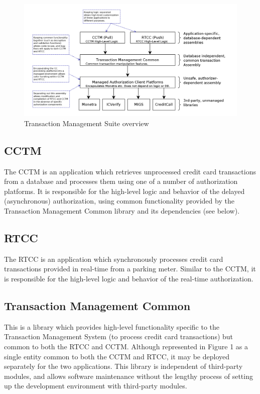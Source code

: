 \documentclass[a4paper,oneside,10pt]{report}
\begin{document}
\begin{figure}
	\centering
		\includegraphics[width=1.0\textwidth]{RTCC_CCTM_Layers.png}
	\caption{Transaction Management Suite overview}
	\label{fig:SuiteOverview}
\end{figure}

\subsection*{CCTM}
The CCTM is an application which retrieves unprocessed credit card transactions from a database and processes them using one of a number of authorization platforms. It is responsible for the high-level logic and behavior of the delayed (asynchronous) authorization, using common functionality provided by the Transaction Management Common library and its dependencies (see below).
\subsection*{RTCC}
The RTCC is an application which synchronously processes credit card transactions provided in real-time from a parking meter. Similar to the CCTM, it is responsible for the high-level logic and behavior of the real-time authorization.

\subsection*{Transaction Management Common}
This is a library which provides high-level functionality specific to the Transaction Management System (to process credit card transactions) but common to both the RTCC and CCTM. Although represented in Figure 1 as a single entity common to both the CCTM and RTCC, it may be deployed separately for the two applications. This library is independent of third-party modules, and allows software maintenance without the lengthy process of setting up the development environment with third-party modules.
\end{document}
